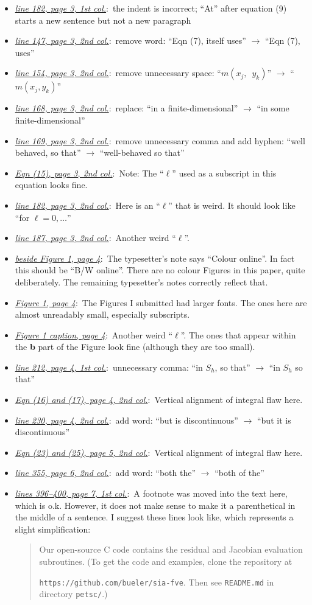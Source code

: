 \documentclass[11pt,reqno]{amsart}
\newcommand{\comm}[2]{\medskip \item[] \hspace{-0.5in}\underline{\emph{#1}}:\, #2}
\newcommand{\lnpagecol}[4]{\comm{line #1, page #2, #3 col.}{#4}}
\newcommand{\lnspagecol}[4]{\comm{lines #1, page #2, #3 col.}{#4}}
\newcommand{\eqnpagecol}[4]{\comm{Eqn #1, page #2, #3 col.}{#4}}
\begin{document}
\begin{itemize}
\lnpagecol{182}{3}{1st}{the indent is incorrect; ``At'' after equation (9) starts a new sentence but not a new paragraph}
\lnpagecol{147}{3}{2nd}{remove word: ``Eqn (7), itself uses'' $\to$ ``Eqn (7), uses''}
\lnpagecol{154}{3}{2nd}{remove unnecessary space: ``$m(x_j,\,\,\,y_k)$'' $\to$ ``$m(x_j,y_k)$''}
\lnpagecol{168}{3}{2nd}{replace: ``in a finite-dimensional'' $\to$ ``in some finite-dimensional''}
\lnpagecol{169}{3}{2nd}{remove unnecessary comma and add hyphen: ``well behaved, so that'' $\to$ ``well-behaved so that''}
\eqnpagecol{(15)}{3}{2nd}{Note:  The ``$\ell$'' used as a subscript in this equation looks fine.}
\lnpagecol{182}{3}{2nd}{Here is an ``$\ell$'' that is weird.  It should look like ``for $\ell=0,\dots$''}
\lnpagecol{187}{3}{2nd}{Another weird ``$\ell$''.}
\comm{beside Figure 1, page 4}{The typesetter's note says ``Colour online''.  In fact this should be ``B/W online''.  There are no colour Figures in this paper, quite deliberately.  The remaining typesetter's notes correctly reflect that.}
\comm{Figure 1, page 4}{The Figures I submitted had larger fonts.  The ones here are almost unreadably small, especially subscripts.}
\comm{Figure 1 caption, page 4}{Another weird ``$\ell$''.  The ones that appear within the \textbf{b} part of the Figure look fine (although they are too small).}
\lnpagecol{212}{4}{1st}{unnecessary comma: ``in $S_h$, so that'' $\to$ ``in $S_h$ so that''}
\eqnpagecol{(16) and (17)}{4}{2nd}{Vertical alignment of integral flaw here.}
\lnpagecol{230}{4}{2nd}{add word: ``but is discontinuous'' $\to$ ``but it is discontinuous''}
\eqnpagecol{(23) and (25)}{5}{2nd}{Vertical alignment of integral flaw here.}
\lnpagecol{355}{6}{2nd}{add word: ``both the'' $\to$ ``both of the''}
\lnspagecol{396--400}{7}{1st}{A footnote was moved into the text here, which is o.k.  However, it does not make sense to make it a parenthetical in the middle of a sentence.  I suggest these lines look like, which represents a slight simplification:

\medskip
\begin{quote}
Our open-source C code contains the residual and Jacobian evaluation subroutines.  (To get the code and examples, clone the repository at\par
 \texttt{https://github.com/bueler/sia-fve}.  Then see \texttt{README.md} in directory \texttt{petsc/}.)
\end{quote}

\medskip

}
\end{itemize}
\end{document}
